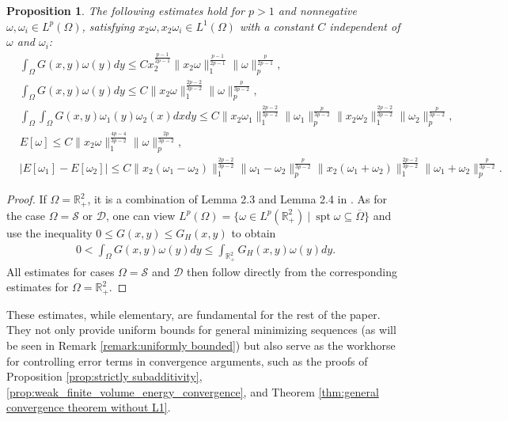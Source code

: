 \documentclass[11pt,letterpaper]{amsart}
\newtheorem{prop}[thm]{Proposition}
\theoremstyle{definition}
\theoremstyle{remark}
\newcommand{\D}{\mathcal{D}}
\renewcommand{\S}{\mathcal{S}}
\newcommand{\R}{\mathbb{R}}
\renewcommand{\O}{\Omega}
\newcommand{\spt}{\operatorname{spt}}
\numberwithin{equation}{section}
\begin{document}
\begin{prop}\label{prop:estimate for kinetic energy}
    The following estimates hold for $p>1$ and nonnegative $\omega,\omega_i\in L^p(\Omega)$, satisfying $x_2\omega, x_2\omega_i\in L^1(\Omega)$ with a constant $C$ independent of $\omega$ and $\omega_i$:
    \begin{align}
        &\int_{\Omega}G(x,y)\omega(y)dy\leq Cx_2^{\frac{p-1}{2p-1}}\|x_2 \omega\|_1^{\frac{p-1}{2p-1}}\|\omega\|_p^{\frac{p}{2p-1}},\label{ineq:estimate of stream fct}\\
        &\int_{\Omega}G(x,y)\omega(y)dy\leq C\|x_2 \omega\|_1^{\frac{2p-2}{3p-2}}\|\omega\|_p^{\frac{p}{3p-2}},\label{ineq:sup estimate of stream fct}\\
        &\int_{\Omega}\int_{\Omega}G(x,y)\omega_1(y)\omega_2(x)dxdy\leq C\|x_2\omega_1\|_1^{\frac{2p-2}{3p-2}}\|\omega_1\|_p^{\frac{p}{3p-2}}\|x_2\omega_2\|_1^{\frac{2p-2}{3p-2}}\|\omega_2\|_p^{\frac{p}{3p-2}},\label{ineq:estimate of energy crossing term}\\
        &E[\omega]\leq C\|x_2\omega\|_1^{\frac{4p-4}{3p-2}}\|\omega\|_p^{\frac{2p}{3p-2}},\label{ineq:estimate of kinetic energy}\\
        &|E[\omega_1]-E[\omega_2]|\leq C\|x_2(\omega_1-\omega_2)\|_1^{\frac{2p-2}{3p-2}}\|\omega_1-\omega_2\|_p^{\frac{p}{3p-2}}\|x_2(\omega_1+\omega_2)\|_1^{\frac{2p-2}{3p-2}}\|\omega_1+\omega_2\|_p^{\frac{p}{3p-2}}.\label{ineq:estimate of energy difference}
    \end{align}
\end{prop}
\begin{proof}
    If $\O=\R^2_+$, it is a combination of Lemma 2.3 and Lemma 2.4 in \cite{abe2025existence}. As for the case $\O=\S$ or $\D$, one can view $L^p(\Omega)=\{\omega\in L^p(\R_+^2) ~ | ~ \spt\omega\subseteq \overline{\O} \}$ and use the inequality $ 0\leq G(x,y)\leq G_H(x,y)$ to obtain
    \begin{align*}
        0<\int_{\O}G(x,y)\omega(y)dy\leq \int_{\R^2_+}G_H(x,y)\omega(y)dy.
    \end{align*}
    All estimates for cases $\O=\S$ and $\D$ then follow directly from the corresponding estimates for $\O=\R^2_+$.
    
\end{proof}

These estimates, while elementary, are fundamental for the rest of the paper. They not only provide uniform bounds for general minimizing sequences (as will be seen in Remark \ref{remark:uniformly bounded}) but also serve as the workhorse for controlling error terms in convergence arguments, such as the proofs of Proposition \ref{prop:strictly subadditivity}, \ref{prop:weak_finite_volume_energy_convergence}, and Theorem \ref{thm:general convergence theorem without L1}. 
\end{document}
